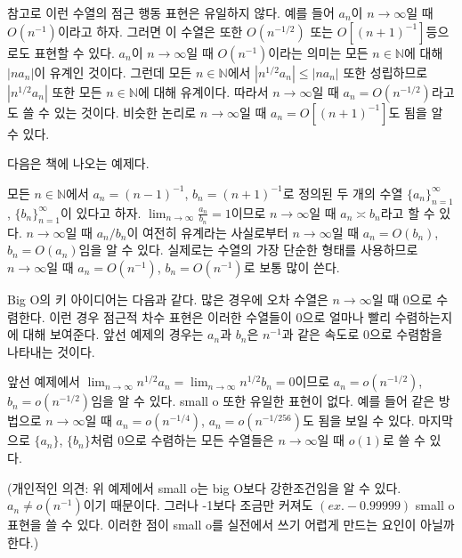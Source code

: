 \documentclass[b5paper,]{scrbook}
\theoremstyle{plain}
\theoremstyle{definition}
\numberwithin{equation}{section}
\let\BeginKnitrBlock\begin \let\EndKnitrBlock\end
\begin{document}
참고로 이런 수열의 점근 행동 표현은 유일하지 않다. 예를 들어 \(a_{n}\)이 \(n\rightarrow\infty\)일 때 \(O(n^{-1})\)이라고 하자. 그러면 이 수열은 또한 \(O(n^{-1/2})\) 또는 \(O[(n+1)^{-1}]\)등으로도 표현할 수 있다. \(a_{n}\)이 \(n\rightarrow\infty\)일 때 \(O(n^{-1})\)이라는 의미는 모든 \(n\in \mathbb{N}\)에 대해 \(|na_{n}|\)이 유계인 것이다. 그런데 모든 \(n\in\mathbb{N}\)에서 \(|n^{1/2}a_{n}|\leq |n a_{n}|\) 또한 성립하므로 \(|n^{1/2}a_{n}|\) 또한 모든 \(n\in \mathbb{N}\)에 대해 유계이다. 따라서 \(n\rightarrow\infty\)일 때 \(a_{n}=O(n^{-1/2})\)라고도 쓸 수 있는 것이다. 비슷한 논리로 \(n\rightarrow\infty\)일 때 \(a_{n}=O[(n+1)^{-1}]\)도 됨을 알 수 있다.

다음은 \citep{Polansky2011} 책에 나오는 예제다.

\BeginKnitrBlock{example}[big O의 의미]
\protect\hypertarget{exm:unnamed-chunk-179}{}{\label{exm:unnamed-chunk-179} {} }모든 \(n\in\mathbb{N}\)에서 \(a_{n} = (n-1)^{-1}\), \(b_{n}=(n+1)^{-1}\)로 정의된 두 개의 수열 \(\{a_{n}\}_{n=1}^{\infty}\), \(\{b_{n}\}_{n=1}^{\infty}\)이 있다고 하자. \(\lim_{n\rightarrow\infty}\frac{a_n}{b_n}=1\)이므로 \(n\rightarrow\infty\)일 때 \(a_{n}\asymp b_{n}\)라고 할 수 있다. \(n\rightarrow\infty\)일 때 \(a_{n}/b_{n}\)이 여전히 유계라는 사실로부터 \(n\rightarrow\infty\)일 때 \(a_{n}=O(b_{n})\), \(b_{n}=O(a_{n})\)임을 알 수 있다. 실제로는 수열의 가장 단순한 형태를 사용하므로 \(n\rightarrow\infty\)일 때 \(a_{n}=O(n^{-1})\), \(b_{n}=O(n^{-1})\)로 보통 많이 쓴다.
\EndKnitrBlock{example}

Big O의 키 아이디어는 다음과 같다. 많은 경우에 오차 수열은 \(n\rightarrow\infty\)일 때 0으로 수렴한다. 이런 경우 점근적 차수 표현은 이러한 수열들이 0으로 얼마나 빨리 수렴하는지에 대해 보여준다. 앞선 예제의 경우는 \(a_{n}\)과 \(b_{n}\)은 \(n^{-1}\)과 같은 속도로 \(0\)으로 수렴함을 나타내는 것이다.

\BeginKnitrBlock{example}[small o]
\protect\hypertarget{exm:unnamed-chunk-180}{}{\label{exm:unnamed-chunk-180} {} }앞선 예제에서 \(\lim_{n\rightarrow\infty} n^{1/2}a_{n} = \lim_{n\rightarrow\infty} n^{1/2}b_{n}=0\)이므로 \(a_{n}=o(n^{-1/2})\), \(b_{n}=o(n^{-1/2})\)임을 알 수 있다. small o 또한 유일한 표현이 없다. 예를 들어 같은 방법으로 \(n\rightarrow\infty\)일 때 \(a_{n}=o(n^{-1/4})\), \(a_{n}=o(n^{-1/256})\)도 됨을 보일 수 있다. 마지막으로 \(\{a_{n}\}\), \(\{b_{n}\}\)처럼 0으로 수렴하는 모든 수열들은 \(n\rightarrow\infty\)일 때 \(o(1)\)로 쓸 수 있다.
\EndKnitrBlock{example}

(개인적인 의견: 위 예제에서 small o는 big O보다 강한조건임을 알 수 있다. \(a_{n} \neq o(n^{-1})\)이기 때문이다. 그러나 -1보다 조금만 커져도 \((ex. -0.99999)\) small o 표현을 쓸 수 있다. 이러한 점이 small o를 실전에서 쓰기 어렵게 만드는 요인이 아닐까 한다.)
\end{document}
